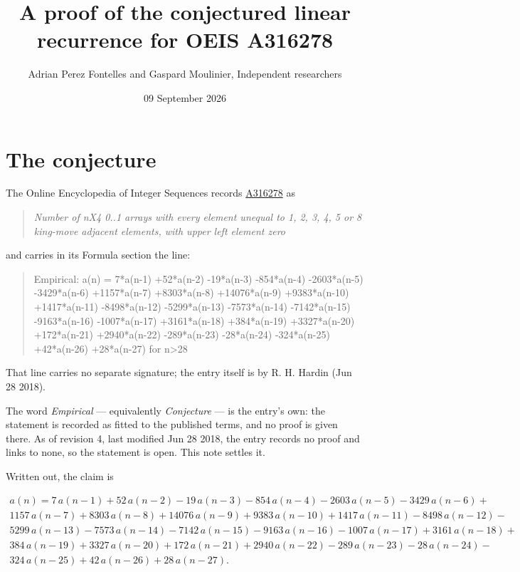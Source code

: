 \documentclass[11pt]{article}
\title{A proof of the conjectured linear recurrence for OEIS A316278}
\author{Adrian Perez Fontelles and Gaspard Moulinier, Independent researchers}
\date{09 September 2026}
\theoremstyle{definition}
\begin{document}
\maketitle
\section{The conjecture}

The Online Encyclopedia of Integer Sequences records \href{https://oeis.org/A316278}{A316278} as

\begin{quote}\itshape Number of nX4 0..1 arrays with every element unequal to 1, 2, 3, 4, 5 or 8 king-move adjacent elements, with upper left element zero\end{quote}

and carries in its Formula section the line:

\begin{quote}\ttfamily Empirical: a(n) = 7*a(n-1) +52*a(n-2) -19*a(n-3) -854*a(n-4) -2603*a(n-5) -3429*a(n-6) +1157*a(n-7) +8303*a(n-8) +14076*a(n-9) +9383*a(n-10) +1417*a(n-11) -8498*a(n-12) -5299*a(n-13) -7573*a(n-14) -7142*a(n-15) -9163*a(n-16) -1007*a(n-17) +3161*a(n-18) +384*a(n-19) +3327*a(n-20) +172*a(n-21) +2940*a(n-22) -289*a(n-23) -28*a(n-24) -324*a(n-25) +42*a(n-26) +28*a(n-27) for n>28\end{quote}

That line carries no separate signature; the entry itself is by R. H. Hardin (Jun 28 2018).

The word {\itshape Empirical} --- equivalently {\itshape Conjecture} --- is the entry's own: the statement is recorded as fitted to the published terms, and no proof is given there. As of revision 4, last modified Jun 28 2018, the entry records no proof and links to none, so the statement is open. This note settles it.

Written out, the claim is

\begin{multline*} a(n) = 7\,a(n-1) + 52\,a(n-2) - 19\,a(n-3) - 854\,a(n-4) - 2603\,a(n-5) - 3429\,a(n-6) + \\ 1157\,a(n-7) + 8303\,a(n-8) + 14076\,a(n-9) + 9383\,a(n-10) + 1417\,a(n-11) - 8498\,a(n-12) - \\ 5299\,a(n-13) - 7573\,a(n-14) - 7142\,a(n-15) - 9163\,a(n-16) - 1007\,a(n-17) + 3161\,a(n-18) + \\ 384\,a(n-19) + 3327\,a(n-20) + 172\,a(n-21) + 2940\,a(n-22) - 289\,a(n-23) - 28\,a(n-24) - \\ 324\,a(n-25) + 42\,a(n-26) + 28\,a(n-27). \end{multline*}
\end{document}
